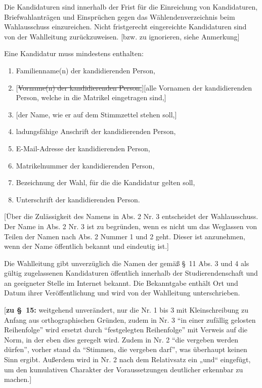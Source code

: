 \documentclass[%
draft,%
multilinesections%
]{fswo}
\newcommand\oldT[1]  {{\color{Gray}[\st{#1}]}}
\newcommand\newT[1]  {{\color{Green}[#1]}}
\newcommand\bemFr[1] {{\color{Red}[#1]}}
\newcommand\oldT[1]{}%
\newcommand\newT[1]{#1}
\newcommand\bemFr[1]{}%
\newcommand\change[2]{\oldT{#1}\newT{#2}}
\begin{document}
\begin{contract}
Die Kandidaturen sind innerhalb der Frist für die Einreichung von Kandidaturen, Briefwahlanträgen und Einsprüchen gegen das Wählendenverzeichnis beim Wahlausschuss einzureichen.
Nicht fristgerecht eingereichte Kandidaturen sind von der Wahlleitung zurückzuweisen.
\bemFr{bzw. zu ignorieren, siehe Anmerkung}

Eine Kandidatur muss mindestens enthalten:
\begin{enumerate}
\item Familienname(n) der kandidierenden Person,
\item \change{Vorname(n) der kandidierenden Person,}{alle Vornamen der kandidierenden Person, welche in die Matrikel eingetragen sind,}
\item \newT{der Name, wie er auf dem Stimmzettel stehen soll,}
\item ladungsfähige Anschrift der kandidierenden Person,
\item E-Mail-Adresse der kandidierenden Person,
\item Matrikelnummer der kandidierenden Person,
\item Bezeichnung der Wahl, für die die Kandidatur gelten soll,
\item Unterschrift der kandidierenden Person.
\end{enumerate}

\newT{Über die Zulässigkeit des Namens in Abs. 2 Nr. 3 entscheidet der Wahlausschuss.
Der Name in Abs. 2 Nr. 3 ist zu begründen, wenn es nicht um das Weglassen von Teilen der Namen nach Abs. 2 Nummer 1 und 2 geht.
Dieser ist anzunehmen, wenn der Name öffentlich bekannt und eindeutig ist.}

Die Wahlleitung gibt unverzüglich die Namen der gemäß \S~11 Abs. 3 und 4 als gültig zugelassenen Kandidaturen öffentlich innerhalb der Studierendenschaft und an geeigneter Stelle im Internet bekannt. %
Die Bekanntgabe enthält Ort und Datum ihrer Veröffentlichung und wird von der Wahlleitung unterschrieben.
\end{contract}

\bemFr{\textbf{zu \S~15:}
weitgehend unverändert, nur die Nr. 1 bis 3 mit Kleinschreibung zu Anfang aus orthographischen Gründen,
zudem in Nr. 3 \enquote{in einer zufällig gelosten Reihenfolge} wird ersetzt durch \enquote{festgelegten Reihenfolge} mit Verweis auf die Norm,
in der eben dies geregelt wird. Zudem in Nr. 2 \enquote{die vergeben werden dürfen}, vorher stand da \enquote{Stimmen, die vergeben darf}, was überhaupt keinen Sinn ergibt.
Außerdem wird in Nr. 2 nach dem Relativsatz ein „und“ eingefügt, um den kumulativen Charakter der Voraussetzungen deutlicher erkennbar zu machen.}
\end{document}
